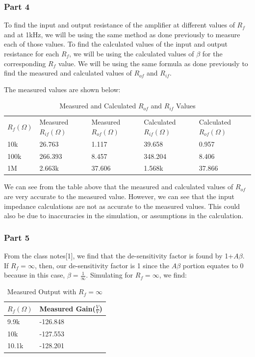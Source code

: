 \documentclass[12pt]{article}
\begin{document}
\subsubsection{Part 4}
To find the input and output resistance of the amplifier at different values of $R_f$ and 
at 1kHz, we will be using the same method as done previously to measure each of those values.
To find the calculated values of the input and output resistance for each $R_f$, we 
will be using the calculated values of $\beta$ for the corresponding $R_f$ value. We 
will be using the same formula as done previously to find the measured and calculated
values of $R_{of}$ and $R_{if}$.

The measured values are shown below:

\begin{table}[h!]
    \centering
    \begin{tabular}{lllll}
    
    $R_f (\Omega)$ & Measured  $R_{if}(\Omega)$ & Measured $R_{of}(\Omega)$ & Calculated $R_{if}(\Omega)$ & Calculated  $R_{of}(\Omega)$ \\ \cline{1-5}
    10k & 26.763 & 1.117 & 39.658 & 0.957 \\ 
    100k & 266.393 & 8.457 & 348.204 & 8.406 \\
    1M & 2.663k & 37.606 & 1.568k & 37.866
    \end{tabular}
    \caption{Measured and Calculated $R_{of}$ and $R_{if}$ Values}
    \label{measuredcalcrifrof}
\end{table}

We can see from the table above that the measured and calculated values of $R_{of}$ 
are very accurate to the measured value. However, we can see that the input impedance
calculations are not as accurate to the measured values. This could also be due to 
inaccuracies in the simulation, or assumptions in the calculation.

\subsubsection{Part 5}

From the class notes[1], we find that the de-sensitivity factor is found by 1+$A\beta$. If $R_f = \infty$,
then, our de-sensitivity factor is 1 since the $A\beta$ portion equates to 0 because in this case, $\beta=\frac
{1}{\infty}$.
Simulating for $R_f=\infty$, we find:

\begin{table}[h!]
    \centering
    \begin{tabular}{ll}
    $R_f(\Omega)$ & Measured Gain($\frac{V}{V}$) \\ \hline
    9.9k & -126.848 \\ 
    10k & -127.553 \\
    10.1k & -128.201
    \end{tabular}
    \caption{Measured Output with $R_f=\infty$}
    \label{measuredoutinf}
\end{table}
\end{document}
